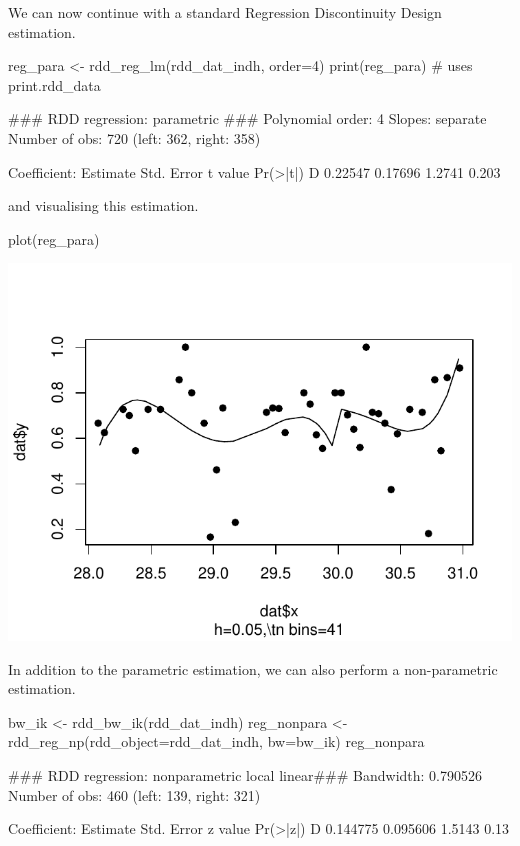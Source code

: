 \documentclass[article]{jss}
\begin{document}
We can now continue with a standard Regression Discontinuity Design
estimation.

\begin{CodeChunk}
\begin{CodeInput}
reg_para <- rdd_reg_lm(rdd_dat_indh, order=4)
print(reg_para) # uses print.rdd_data
\end{CodeInput}
\begin{CodeOutput}
### RDD regression: parametric ###
    Polynomial order:  4 
    Slopes:  separate 
    Number of obs: 720 (left: 362, right: 358)

    Coefficient:
  Estimate Std. Error t value Pr(>|t|)
D  0.22547    0.17696  1.2741    0.203
\end{CodeOutput}
\end{CodeChunk}

and visualising this estimation.

\begin{CodeChunk}
\begin{CodeInput}
plot(reg_para)
\end{CodeInput}


\begin{center}\includegraphics{README_files/figure-latex/plot-reg_para-1} \end{center}

\end{CodeChunk}

In addition to the parametric estimation, we can also perform a
non-parametric estimation.

\begin{CodeChunk}
\begin{CodeInput}
bw_ik <- rdd_bw_ik(rdd_dat_indh)
reg_nonpara <- rdd_reg_np(rdd_object=rdd_dat_indh, bw=bw_ik)
reg_nonpara
\end{CodeInput}
\begin{CodeOutput}
### RDD regression: nonparametric local linear###
    Bandwidth:  0.790526 
    Number of obs: 460 (left: 139, right: 321)

    Coefficient:
  Estimate Std. Error z value Pr(>|z|)
D 0.144775   0.095606  1.5143     0.13
\end{CodeOutput}
\end{CodeChunk}
\end{document}
